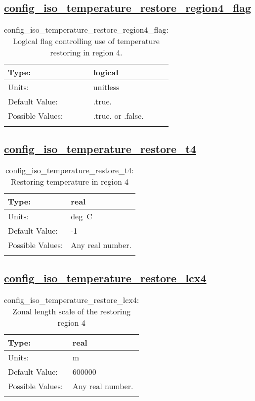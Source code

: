 \subsection[config\_iso\_temperature\_restore\_region4\_flag]{\hyperref[sec:nm_tab_iso]{config\_iso\_temperature\_restore\_region4\_flag}}
\label{subsec:nm_sec_config_iso_temperature_restore_region4_flag}
\begin{center}
\begin{longtable}{| p{2.0in} || p{4.0in} |}
    \hline
    Type: & logical \\
    \hline
    Units: & \si{unitless} \\
    \hline
    Default Value: & .true. \\
    \hline
    Possible Values: & .true. or .false. \\
    \hline
    \caption{config\_iso\_temperature\_restore\_region4\_flag: Logical flag controlling use of temperature restoring in region 4.}
\end{longtable}
\end{center}
\subsection[config\_iso\_temperature\_restore\_t4]{\hyperref[sec:nm_tab_iso]{config\_iso\_temperature\_restore\_t4}}
\label{subsec:nm_sec_config_iso_temperature_restore_t4}
\begin{center}
\begin{longtable}{| p{2.0in} || p{4.0in} |}
    \hline
    Type: & real \\
    \hline
    Units: & \si{deg.C} \\
    \hline
    Default Value: & -1 \\
    \hline
    Possible Values: & Any real number. \\
    \hline
    \caption{config\_iso\_temperature\_restore\_t4: Restoring temperature in region 4}
\end{longtable}
\end{center}
\subsection[config\_iso\_temperature\_restore\_lcx4]{\hyperref[sec:nm_tab_iso]{config\_iso\_temperature\_restore\_lcx4}}
\label{subsec:nm_sec_config_iso_temperature_restore_lcx4}
\begin{center}
\begin{longtable}{| p{2.0in} || p{4.0in} |}
    \hline
    Type: & real \\
    \hline
    Units: & \si{m} \\
    \hline
    Default Value: & 600000 \\
    \hline
    Possible Values: & Any real number. \\
    \hline
    \caption{config\_iso\_temperature\_restore\_lcx4: Zonal length scale of the restoring region 4}
\end{longtable}
\end{center}
